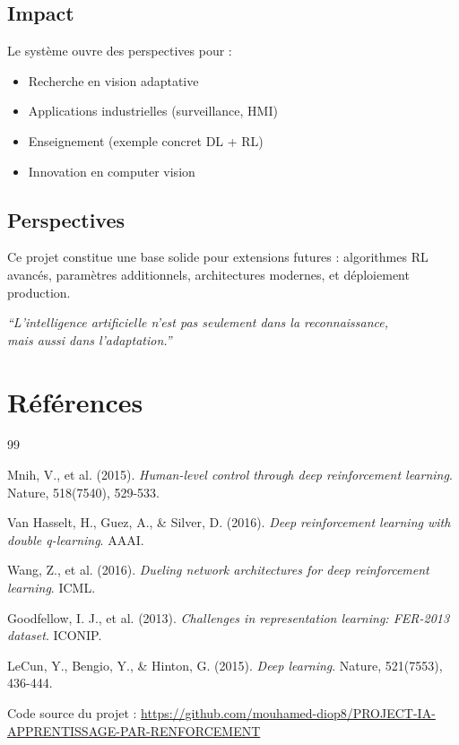\documentclass[12pt,a4paper]{article}
\begin{document}
\subsection{Impact}
Le système ouvre des perspectives pour :
\begin{itemize}
    \item Recherche en vision adaptative
    \item Applications industrielles (surveillance, HMI)
    \item Enseignement (exemple concret DL + RL)
    \item Innovation en computer vision
\end{itemize}

\subsection{Perspectives}
Ce projet constitue une base solide pour extensions futures : algorithmes RL avancés, paramètres additionnels, architectures modernes, et déploiement production.

\vspace{1cm}

\begin{center}
\textit{``L'intelligence artificielle n'est pas seulement dans la reconnaissance,\\
mais aussi dans l'adaptation.''}
\end{center}

\newpage

\section*{Références}

\begin{thebibliography}{99}

Mnih, V., et al. (2015). \textit{Human-level control through deep reinforcement learning}. Nature, 518(7540), 529-533.

Van Hasselt, H., Guez, A., \& Silver, D. (2016). \textit{Deep reinforcement learning with double q-learning}. AAAI.

Wang, Z., et al. (2016). \textit{Dueling network architectures for deep reinforcement learning}. ICML.

Goodfellow, I. J., et al. (2013). \textit{Challenges in representation learning: FER-2013 dataset}. ICONIP.

LeCun, Y., Bengio, Y., \& Hinton, G. (2015). \textit{Deep learning}. Nature, 521(7553), 436-444.

Code source du projet : \url{https://github.com/mouhamed-diop8/PROJECT-IA-APPRENTISSAGE-PAR-RENFORCEMENT}

\end{thebibliography}
\end{document}
